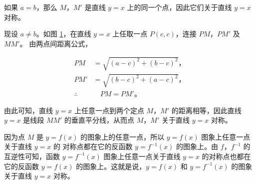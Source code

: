 如果 $a = b$，那么 $M$，$M'$ 是直线 $y = x$ 上的同一个点，因此它们关于直线 $y = x$ 对称。

\begin{figure}[htbp]
    \centering
    
    \caption{}\label{fig:1-27}
\end{figure}

现设 $a \neq b$。如图 \ref{fig:1-27}，在直线 $y = x$ 上任取一点 $P(c,c)$，连接 $PM$，$PM'$ 及 $MM'$。
由两点间距离公式，

\begin{align*}
    PM &= \sqrt{(a - c)^2 + (b - c)^2} \text{，} \\
    PM' &= \sqrt{(b - c)^2 + (a - c)^2} \text{，} \\
    \therefore &\quad PM = PM' \text{。}
\end{align*}

由此可知，直线 $y = x$ 上任意一点到两个定点 $M$，$M'$ 的距离相等，因此直线 $y = x$ 是线段 $MM'$
的垂直平分线，从而点 $M$，$M'$ 关于直线 $y = x$ 对称。

因为点 $M$ 是 $y = f(x)$ 的图象上的任意一点，所以 $y = f(x)$ 图象上任意一点关于直线 $y = x$ 的
对称点都在它的反函数 $y = f^{-1}(x)$ 的图象上。由 $f$，$f^{-1}$ 的互逆性可知，函数  $y = f^{-1}(x)$
图象上任意一点关于直线 $y = x$ 的对称点也都在它的反函数 $y = f(x)$ 的图象上。这就是说，$y = f(x)$
和  $y = f^{-1}(x)$ 的图象关于直线 $y = x$ 对称。

\lianxi


